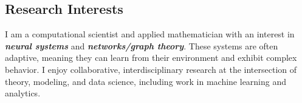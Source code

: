 \documentclass[margin,line]{res}
\newenvironment{list1}{
  \begin{list}{$\cdot$}{%
      \setlength{\itemsep}{0in}
      \setlength{\parsep}{0in} \setlength{\parskip}{0in}
      \setlength{\topsep}{0in} \setlength{\partopsep}{0in} 
      \setlength{\leftmargin}{0.17in}}}{\end{list}}
\begin{document}
\begin{resume}
  \section{\sc Research Interests}

  I am a computational scientist and applied mathematician 
  with an interest in {\em \bf neural systems} and
  {\em \bf networks/graph theory}. 
  These systems are often adaptive, meaning they can
  learn from their environment 
  and exhibit complex behavior.
  I enjoy collaborative, interdisciplinary research at the
  intersection of theory, modeling, and data science,
  including work in machine learning and analytics.







\end{resume}
\end{document}
